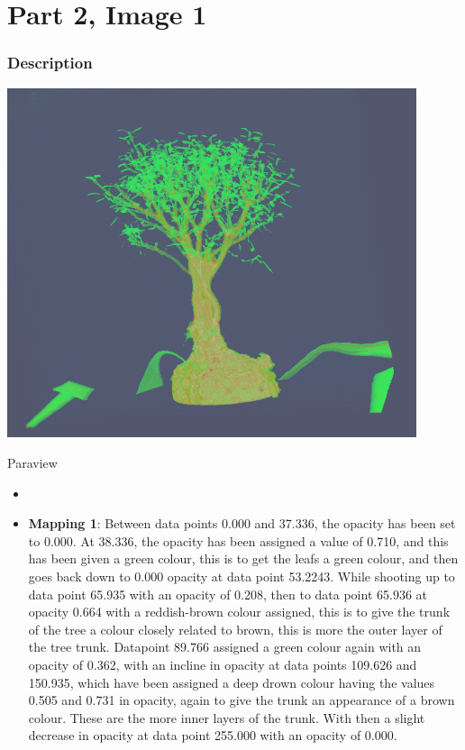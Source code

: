 \hypertarget{part-2-image-1}{%
	\section{Part 2, Image 1}\label{part-1-design-2}}

\centering


\hypertarget{description}{%
	\subsubsection{Description}\label{description}}

\begin{description}
	\item[Image:]
	\item\includegraphics[width=12cm]{Tree1.png}
	
	\item[Tool:]
	\hfill \break 
		Paraview
	\item[Visual Mappings:]
	\begin{itemize}
		\tightlist
		\item[ ]
	\end{itemize}
	\begin{itemize}
		\tightlist
		\item
		\textbf{Mapping 1}:
		\hfill \break 
			Between data points 0.000 and 37.336, the opacity has been set to 0.000. At 38.336, the opacity has been assigned a value of 0.710, and this has been given a green colour, this is to get the leafs a green colour, and then goes back down to 0.000 opacity at data point 53.2243. While shooting up to data point 65.935 with an opacity of 0.208, then to data point 65.936 at opacity 0.664 with a reddish-brown colour assigned, this is to give the trunk of the tree a colour closely related to brown, this is more the outer layer of the tree trunk. Datapoint 89.766 assigned a green colour again with an opacity of 0.362, with an incline in opacity at data points 109.626 and 150.935, which have been assigned a deep drown colour having the values 0.505 and 0.731 in opacity, again to give the trunk an appearance of a brown colour. These are the more inner layers of the trunk. With then a slight decrease in opacity at data point 255.000 with an opacity of 0.000.
	\end{itemize}
	

\end{description}
